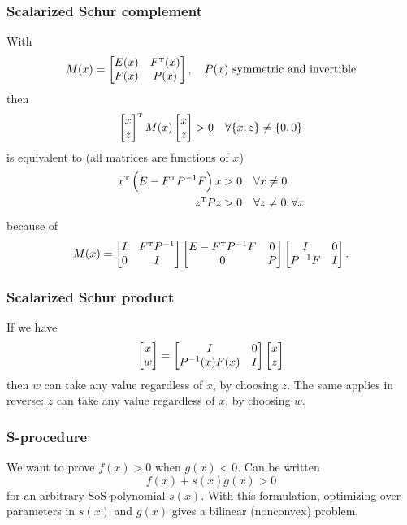 \subsubsection{Scalarized Schur complement}
With
%
\begin{equation}
  M(x) = \bmat{E(x) & F\tp(x) \\ F(x) & P(x)},\quad P(x) \mbox{ symmetric and invertible}
\end{equation}
%
then
%
\begin{equation}
  \bmat{x \\ z}\tp M(x) \bmat{x \\ z} > 0 \quad \forall\{x,z\} \neq \{0,0\}
\end{equation}
%
is equivalent to (all matrices are functions of $x$)
%
\begin{equation}
  \begin{split}
    x\tp \left( E - F\tp P\inv F \right) x &> 0 \quad \forall x \neq 0 \\
    z\tp P z &> 0 \quad \forall z \neq 0, \forall x
  \end{split}
\end{equation}
%
because of
%
\begin{equation}
  M(x) =
  \bmat{I & F\tp P\inv \\ 0 & I}
  \bmat{E - F\tp P\inv F & 0 \\ 0 & P}
  \bmat{I & 0 \\ P\inv F & I}.
\end{equation}

\subsubsection{Scalarized Schur product}
If we have
%
\begin{equation}
  \begin{bmatrix} x \\ w \end{bmatrix} =
  \begin{bmatrix} I & 0 \\ P^{-1}(x) F(x) & I \end{bmatrix}
  \begin{bmatrix} x \\ z \end{bmatrix}
\end{equation}
%
then $w$ can take any value regardless of $x$, by choosing $z$. The same applies in reverse: $z$ can take any value regardless of $x$, by choosing $w$.

\subsubsection{S-procedure}
We want to prove $f(x) > 0$ when $g(x) < 0$. Can be written
%
\begin{equation}
  f(x) + s(x) g(x) > 0
\end{equation}
%
for an arbitrary SoS polynomial $s(x)$. With this formulation, optimizing over parameters in $s(x)$ and $g(x)$ gives a bilinear (nonconvex) problem.

